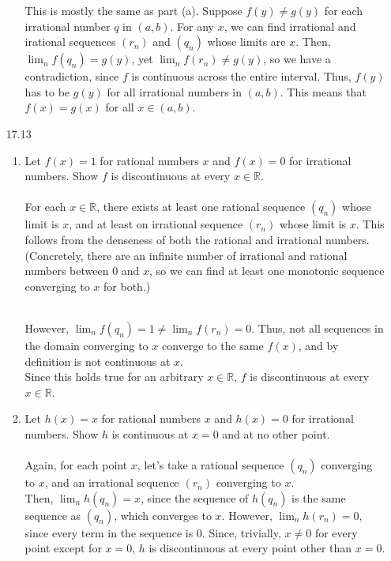 \begin{enumerate}
\begin{enumerate}
        This is mostly the same as part (a). Suppose $f(y) \neq g(y)$ for each irrational number $q$ in $(a,b)$. For any $x$, we can find  irrational and irational sequences $(r_n)$ and $(q_n)$ whose limits are $x$. Then, $\lim_{n} f(q_n) = g(y)$, yet $\lim_{n} f(r_n) \neq g(y)$, so we have a contradiction, since $f$ is continuous across the entire interval. Thus, $f(y)$ has to be $g(y)$ for all irrational numbers in $(a,b)$. This means that $f(x) = g(x)$ for all $x \in (a,b)$.
    \end{enumerate}
  \item [17.13]
    \begin{enumerate}
      \item Let $f(x) = 1$ for rational numbers $x$ and $f(x) = 0$ for irrational numbers. Show $f$ is discontinuous at every $x \in \mathds{R}$.\\\\

        For each $x \in \mathds{R}$, there exists at least one rational sequence $(q_n)$ whose limit is $x$, and at least on irrational sequence $(r_n)$ whose limit is $x$. This follows from the denseness of both the rational and irrational numbers. (Concretely, there are an infinite number of irrational and rational numbers between $0$ and $x$, so we can find at least one monotonic sequence converging to $x$ for both.)\\\

        However, $\lim_{n} f(q_n) = 1 \neq \lim_{n} f(r_n) = 0$. Thus, not all sequences in the domain converging to $x$ converge to the same $f(x)$, and by definition is not continuous at $x$.\\

        Since this holds true for an arbitrary $x \in \mathds{R}$, $f$ is discontinuous at every $x \in \mathds{R}$.
      \item Let $h(x) = x$ for rational numbers $x$ and $h(x) = 0$ for irrational numbers. Show $h$ is continuous at $x = 0$ and at no other point.\\\\

        Again, for each point $x$, let's take a rational sequence $(q_n)$ converging to $x$, and an irrational sequence $(r_n)$ converging to $x$.\\

        Then, $\lim_{n} h(q_n) = x$, since the sequence of $h(q_n)$ is the same sequence as $(q_n)$, which converges to $x$. However, $\lim_{n} h(r_n) = 0$, since every term in the sequence is $0$. Since, trivially, $x \neq 0$ for every point except for $x=0$, $h$ is discontinuous at every point other than $x=0$.
    \end{enumerate}
\end{enumerate}


